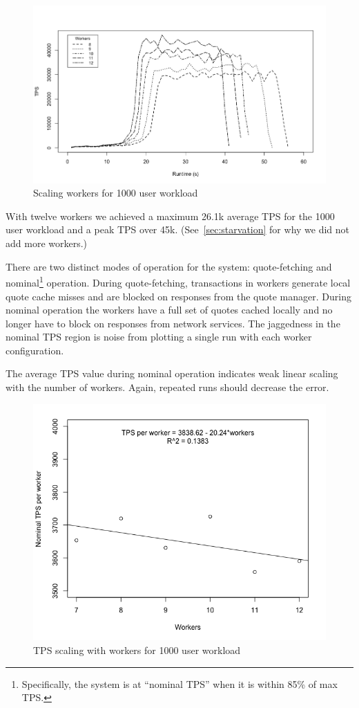 \begin{figure}[tbph]
  \centering
  \includegraphics[width=0.8\linewidth]{../graphics/multi-worker}
  \caption{Scaling workers for 1000 user workload}
  \label{fig:tps-scaling}
\end{figure}

With twelve workers we achieved a maximum 26.1k average TPS for the 1000 user workload and a peak TPS over 45k. (See~\ref{sec:starvation} for why we did not add more workers.)

There are two distinct modes of operation for the system: quote-fetching and nominal\footnote{Specifically, the system is at ``nominal TPS'' when it is within 85\% of max TPS.} operation.
During quote-fetching, transactions in workers generate local quote cache misses and are blocked on responses from the quote manager.
During nominal operation the workers have a full set of quotes cached locally and no longer have to block on responses from network services.
The jaggedness in the nominal TPS region is noise from plotting a single run with each worker configuration.

The average TPS value during nominal operation indicates weak linear scaling with the number of workers.
Again, repeated runs should decrease the error.

\begin{figure}[tbph]
  \centering
  \includegraphics[width=0.7\linewidth]{graphics/tps-per-worker}
  \caption{TPS scaling with workers for 1000 user workload}
  \label{fig:tps-per-worker}
\end{figure}

